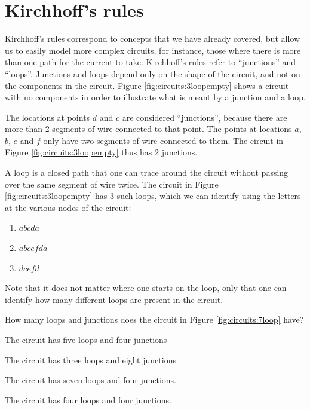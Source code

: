 \section{Kirchhoff's rules}
Kirchhoff's rules correspond to concepts that we have already covered, but allow us to easily model more complex circuits, for instance, those where there is more than one path for the current to take. Kirchhoff's rules refer to ``junctions'' and ``loops''. Junctions and loops depend only on the shape of the circuit, and not on the components in the circuit. Figure \ref{fig:circuits:3loopempty} shows a circuit with no components in order to illustrate what is meant by a junction and a loop.


The locations at points $d$ and $c$ are considered ``junctions'', because there are more than 2 segments of wire connected to that point. The points at locations $a$, $b$, $e$ and $f$ only have two segments of wire connected to them. The circuit in Figure \ref{fig:circuits:3loopempty} thus has 2 junctions. 

A loop is a closed path that one can trace around the circuit without passing over the same segment of wire twice. The circuit in Figure \ref{fig:circuits:3loopempty} has 3 such loops, which we can identify using the letters at the various nodes of the circuit:
\begin{enumerate}
\item $abcda$
\item $abcefda$
\item $dcefd$
\end{enumerate}
Note that it does not matter where one starts on the loop, only that one can identify how many different loops are present in the circuit. %
 
\begin{checkpoint}{	}
 \begin{MCquestion}{How many loops and junctions does the circuit in Figure \ref{fig:circuits:7loop} have?}
 \item The circuit has five loops and four junctions
 \item The circuit has three loops and eight junctions
 \item The circuit has seven loops and four junctions. \correct
 \item The circuit has four loops and four junctions.
 \end{MCquestion}
\end{checkpoint}

